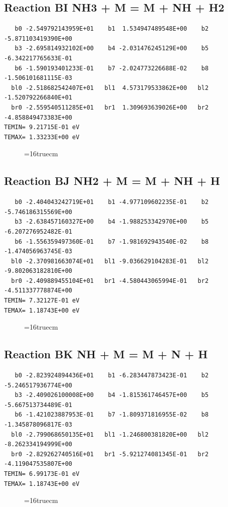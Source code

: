 \documentclass[12pt,dvipdfm]{article}
\begin{document}
\subsection{
Reaction BI NH3 + M = M + NH + H2 }
\begin{small}\begin{verbatim}
   b0 -2.549792143959E+01    b1  1.534947489548E+00    b2 -5.871103419390E+00
   b3 -2.695814932102E+00    b4 -2.031476245129E+00    b5 -6.342217765633E-01
   b6 -1.590193401233E-01    b7 -2.024773226688E-02    b8 -1.506101681115E-03
  bl0 -2.518682542407E+01   bl1  4.573179533862E+00   bl2 -1.520792266840E+01
  br0 -2.559540511285E+01   br1  1.309693639026E+00   br2 -4.858849473383E+00
TEMIN= 9.21715E-01 eV
TEMAX= 1.33233E+00 eV
   \end{verbatim}\end{small}
\begin{figure}[h!]
\label{n2rates}
\epsfxsize=16truecm
\end{figure}
\newpage

\subsection{
Reaction BJ NH2 + M = M + NH + H }
\begin{small}\begin{verbatim}
   b0 -2.404043242719E+01    b1 -4.977109602235E-01    b2 -5.746186315569E+00
   b3 -2.638457160327E+00    b4 -1.988253342970E+00    b5 -6.207276952482E-01
   b6 -1.556359497360E-01    b7 -1.981692943540E-02    b8 -1.474056963745E-03
  bl0 -2.370981663074E+01   bl1 -9.036629104283E-01   bl2 -9.802063182810E+00
  br0 -2.409889455104E+01   br1 -4.580443065994E-01   br2 -4.511337778874E+00
TEMIN= 7.32127E-01 eV
TEMAX= 1.18743E+00 eV
   \end{verbatim}\end{small}
\begin{figure}[h!]
\label{n2rates}
\epsfxsize=16truecm
\end{figure}
\newpage

\subsection{
Reaction BK NH + M = M + N + H  }
\begin{small}\begin{verbatim}
   b0 -2.823924894436E+01    b1 -6.283447873423E-01    b2 -5.246517936774E+00
   b3 -2.409026100008E+00    b4 -1.815361746457E+00    b5 -5.667513734489E-01
   b6 -1.421023887953E-01    b7 -1.809371816955E-02    b8 -1.345878096817E-03
  bl0 -2.799068650135E+01   bl1 -1.246800381820E+00   bl2 -8.262334194999E+00
  br0 -2.829262740516E+01   br1 -5.921274081345E-01   br2 -4.119047535807E+00
TEMIN= 6.99173E-01 eV
TEMAX= 1.18743E+00 eV
   \end{verbatim}\end{small}
\begin{figure}[h!]
\label{n2rates}
\epsfxsize=16truecm
\end{figure}
\newpage
\end{document}
